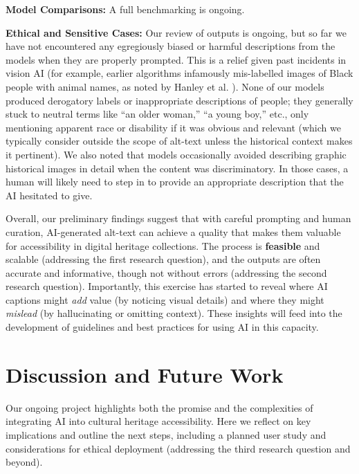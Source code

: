 \documentclass{anthology-ch}         %
\begin{document}
\textbf{Model Comparisons:} A full benchmarking is ongoing.

\textbf{Ethical and Sensitive Cases:} Our review of outputs is ongoing, but so far we have not encountered any egregiously biased or harmful descriptions from the models when they are properly prompted. This is a relief given past incidents in vision AI (for example, earlier algorithms infamously mis-labelled images of Black people with animal names, as noted by Hanley et al. \autocite{hanley2021}). None of our models produced derogatory labels or inappropriate descriptions of people; they generally stuck to neutral terms like ``an older woman,'' ``a young boy,'' etc., only mentioning apparent race or disability if it was obvious and relevant (which we typically consider outside the scope of alt-text unless the historical context makes it pertinent). We also noted that models occasionally avoided describing graphic historical images in detail when the content was discriminatory. In those cases, a human will likely need to step in to provide an appropriate description that the AI hesitated to give.

Overall, our preliminary findings suggest that with careful prompting and human curation, AI-generated alt-text can achieve a quality that makes them valuable for accessibility in digital heritage collections. The process is \textbf{feasible} and scalable (addressing the first research question), and the outputs are often accurate and informative, though not without errors (addressing the second research question). Importantly, this exercise has started to reveal where AI captions might \emph{add} value (by noticing visual details) and where they might \emph{mislead} (by hallucinating or omitting context). These insights will feed into the development of guidelines and best practices for using AI in this capacity.

\section{Discussion and Future Work}

Our ongoing project highlights both the promise and the complexities of integrating AI into cultural heritage accessibility. Here we reflect on key implications and outline the next steps, including a planned user study and considerations for ethical deployment (addressing the third research question and beyond).
\end{document}
